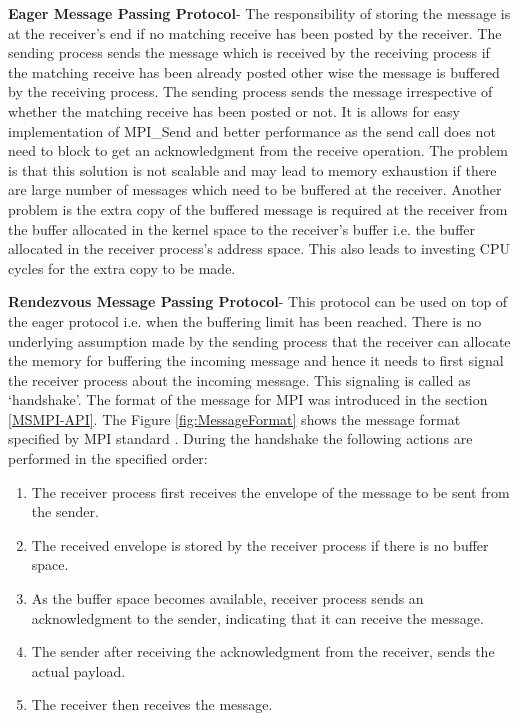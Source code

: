 \textbf{Eager Message Passing Protocol}- The responsibility of storing the message is at the receiver's end if no matching receive has been posted by the receiver. The sending process sends the message which is received by the receiving process if the matching receive has been already posted other wise the message is buffered by the receiving process. The sending process sends the message irrespective of whether the matching receive has been posted or not. It is allows for easy implementation of MPI\_Send and better performance as the send call does not need to block to get an acknowledgment from the receive operation. The problem is that this solution is not scalable and may lead to memory exhaustion if there are large number of messages which need to be buffered at the receiver. Another problem is the extra copy of the buffered message is required at the receiver from the buffer allocated in the kernel space to the receiver's buffer i.e. the buffer allocated  in the receiver process's address space. This also leads to investing CPU cycles for the extra copy to be made.       

\textbf{Rendezvous Message Passing Protocol}- This protocol can be used on top of the eager protocol i.e. when the buffering limit has been reached. There is no underlying assumption made by the sending process that the receiver can allocate the memory for buffering the incoming message and hence it needs to first signal the receiver process about the incoming message. This signaling is called as {\lq}handshake{\rq}. The format of the message for MPI was introduced in the  section \ref{MSMPI-API}. The Figure \ref{fig:MessageFormat} shows the message format specified by MPI standard \cite{mpiMsgForm}. During the handshake the following actions are performed in the specified order: 

\begin{enumerate}
\item The receiver process first receives the envelope of the message to be sent from the sender.
\item The received envelope is stored by the receiver process if there is no buffer space. 
\item As the buffer space becomes available, receiver process sends an acknowledgment to the sender, indicating that it can receive the message.
\item The sender after receiving the acknowledgment from the receiver, sends the actual payload. 
\item The receiver then receives the message. 
\end{enumerate}   

